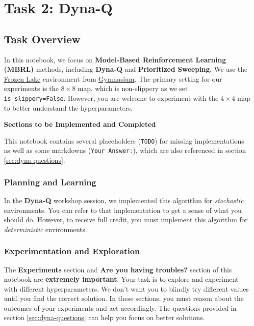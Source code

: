 \section{Task 2: Dyna-Q}

\subsection{Task Overview} 
In this notebook, we focus on \textbf{Model-Based Reinforcement Learning (MBRL)} methods, including \textbf{Dyna-Q} and \textbf{Prioritized Sweeping}. 
We use the \href{https://gymnasium.farama.org/environments/toy_text/frozen_lake/}{Frozen Lake} environment from \href{https://gymnasium.farama.org}{Gymnasium}. 
The primary setting for our experiments is the \texttt{$8 \times 8$} map, which is non-slippery as we set \texttt{is\_slippery=False}. 
However, you are welcome to experiment with the \texttt{$4 \times 4$} map to better understand the hyperparameters.

\textbf{Sections to be Implemented and Completed}

This notebook contains several placeholders (\texttt{TODO}) for missing implementations as well as some markdowns (\texttt{Your Answer:}), which are also referenced in section \ref{sec:dyna-questions}.

\subsubsection{Planning and Learning} 
In the \textbf{Dyna-Q} workshop session, we implemented this algorithm for \textit{stochastic} environments. 
You can refer to that implementation to get a sense of what you should do. 
However, to receive full credit, you must implement this algorithm for \textit{deterministic} environments.

\subsubsection{Experimentation and Exploration} 
The \textbf{Experiments} section and \textbf{Are you having troubles?} section of this notebook are \textbf{extremely important}. 
Your task is to explore and experiment with different hyperparameters. 
We don't want you to blindly try different values until you find the correct solution. 
In these sections, you must reason about the outcomes of your experiments and act accordingly. 
The questions provided in section \ref{sec:dyna-questions} can help you focus on better solutions.

